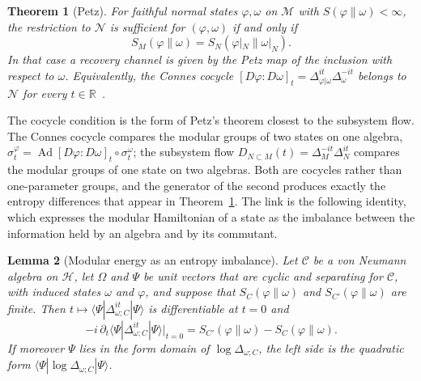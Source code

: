 \documentclass[a4paper,11pt]{article}
\newtheorem{theorem}{Theorem}
\newtheorem{lemma}[theorem]{Lemma}
\theoremstyle{definition}
\begin{document}
\begin{theorem}[Petz]\label{thm:Petz}
For faithful normal states $\varphi,\omega$ on $\mathcal M$ with $S(\varphi\|\omega)<\infty$, the restriction to $\mathcal N$ is sufficient for $(\varphi,\omega)$ if and only if
\[
 S_M(\varphi\|\omega)=S_N(\varphi|_N\|\omega|_N) .
\]
In that case a recovery channel is given by the Petz map of the inclusion with respect to $\omega$. Equivalently, the Connes cocycle $[D\varphi:D\omega]_t=\Delta_{\varphi|\omega}^{it}\Delta_{\omega}^{-it}$ belongs to $\mathcal N$ for every $t\in\mathbb R$~\cite{Petz1988,JencovaPetz2006}.
\end{theorem}

The cocycle condition is the form of Petz's theorem closest to the subsystem flow. The Connes cocycle compares the modular groups of two states on one algebra, $\sigma^{\varphi}_t=\operatorname{Ad}[D\varphi:D\omega]_t\circ\sigma^{\omega}_t$; the subsystem flow $D_{N\subset M}(t)=\Delta_M^{-it}\Delta_N^{it}$ compares the modular groups of one state on two algebras. Both are cocycles rather than one-parameter groups, and the generator of the second produces exactly the entropy differences that appear in Theorem~\ref{thm:Petz}. The link is the following identity, which expresses the modular Hamiltonian of a state as the imbalance between the information held by an algebra and by its commutant.

\begin{lemma}[Modular energy as an entropy imbalance]\label{lem:modular-energy}
Let $\mathcal C$ be a von Neumann algebra on $\mathcal H$, let $\Omega$ and $\Psi$ be unit vectors that are cyclic and separating for $\mathcal C$, with induced states $\omega$ and $\varphi$, and suppose that $S_C(\varphi\|\omega)$ and $S_{C'}(\varphi\|\omega)$ are finite. Then $t\mapsto\langle\Psi|\Delta_{\omega;C}^{it}|\Psi\rangle$ is differentiable at $t=0$ and
\begin{equation}
 -i\,\partial_t\langle\Psi|\Delta_{\omega;C}^{it}|\Psi\rangle\big|_{t=0}
 =S_{C'}(\varphi\|\omega)-S_C(\varphi\|\omega).
 \label{eq:modular-energy}
\end{equation}
If moreover $\Psi$ lies in the form domain of $\log\Delta_{\omega;C}$, the left side is the quadratic form $\langle\Psi|\log\Delta_{\omega;C}|\Psi\rangle$.
\end{lemma}
\end{document}
